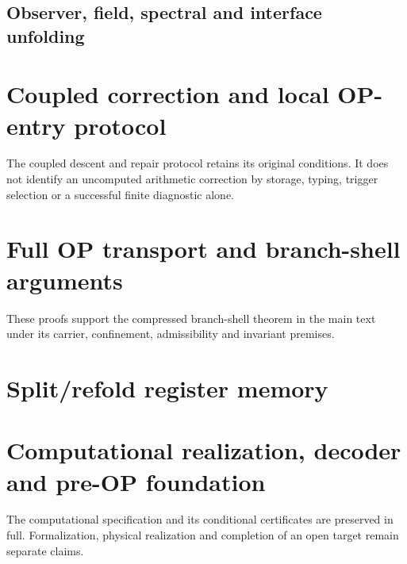 \subsection{Observer, field, spectral and interface unfolding}
\label{app:phase-iv-unfolding}


\section{Coupled correction and local OP-entry protocol}
\label{app:local-op-entry}
The coupled descent and repair protocol retains its original conditions.
It does not identify an uncomputed arithmetic correction by storage,
typing, trigger selection or a successful finite diagnostic alone.


\section{Full OP transport and branch-shell arguments}
\label{app:op-transport-unfolding}
These proofs support the compressed branch-shell theorem in the main
text under its carrier, confinement, admissibility and invariant premises.


\section{Split/refold register memory}
\label{app:split-refold-memory}


\section{Computational realization, decoder and pre-OP foundation}
\label{app:computational-protocols}
The computational specification and its conditional certificates are
preserved in full. Formalization, physical realization and completion
of an open target remain separate claims.




